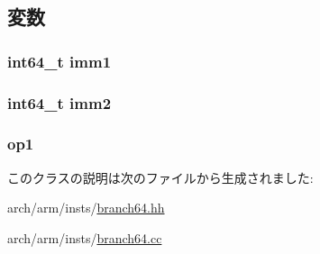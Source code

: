 \subsection{変数}
\hypertarget{classArmISA_1_1BranchImmImmReg64_a6ccc7c2674222b503fff1477061ccdfa}{
\subsubsection[{imm1}]{\setlength{\rightskip}{0pt plus 5cm}int64\_\-t {\bf imm1}}}
\label{classArmISA_1_1BranchImmImmReg64_a6ccc7c2674222b503fff1477061ccdfa}
\hypertarget{classArmISA_1_1BranchImmImmReg64_a0c27335409ea85af7c62f6d73dfab8c8}{
\subsubsection[{imm2}]{\setlength{\rightskip}{0pt plus 5cm}int64\_\-t {\bf imm2}}}
\label{classArmISA_1_1BranchImmImmReg64_a0c27335409ea85af7c62f6d73dfab8c8}
\hypertarget{classArmISA_1_1BranchImmImmReg64_a4c465c43ad568f8bcf8ae71480e9cfea}{
\subsubsection[{op1}]{ {\bf op1}}}
\label{classArmISA_1_1BranchImmImmReg64_a4c465c43ad568f8bcf8ae71480e9cfea}


このクラスの説明は次のファイルから生成されました:\begin{DoxyCompactItemize}
\item 
arch/arm/insts/\hyperlink{branch64_8hh}{branch64.hh}\item 
arch/arm/insts/\hyperlink{branch64_8cc}{branch64.cc}\end{DoxyCompactItemize}
